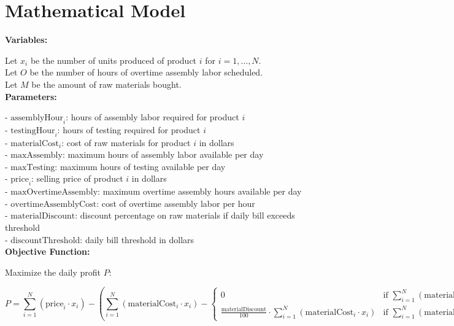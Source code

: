 \documentclass{article}
\begin{document}
\section*{Mathematical Model}

\textbf{Variables:}

Let \( x_i \) be the number of units produced of product \( i \) for \( i = 1, \ldots, N \). \\
Let \( O \) be the number of hours of overtime assembly labor scheduled. \\
Let \( M \) be the amount of raw materials bought. \\

\textbf{Parameters:}

- \( \text{assemblyHour}_i \): hours of assembly labor required for product \( i \) \\
- \( \text{testingHour}_i \): hours of testing required for product \( i \) \\
- \( \text{materialCost}_i \): cost of raw materials for product \( i \) in dollars \\
- \( \text{maxAssembly} \): maximum hours of assembly labor available per day \\
- \( \text{maxTesting} \): maximum hours of testing available per day \\
- \( \text{price}_i \): selling price of product \( i \) in dollars \\
- \( \text{maxOvertimeAssembly} \): maximum overtime assembly hours available per day \\
- \( \text{overtimeAssemblyCost} \): cost of overtime assembly labor per hour \\
- \( \text{materialDiscount} \): discount percentage on raw materials if daily bill exceeds threshold \\
- \( \text{discountThreshold} \): daily bill threshold in dollars \\

\textbf{Objective Function:}

Maximize the daily profit \( P \):

\[
P = \sum_{i=1}^{N} \left( \text{price}_i \cdot x_i \right) - \left( \sum_{i=1}^{N} \left( \text{materialCost}_i \cdot x_i \right) - 
\begin{cases} 
0 & \text{if } \sum_{i=1}^{N} \left( \text{materialCost}_i \cdot x_i \right) \leq \text{discountThreshold} \\
\frac{\text{materialDiscount}}{100} \cdot \sum_{i=1}^{N} \left( \text{materialCost}_i \cdot x_i \right) & \text{if } \sum_{i=1}^{N} \left( \text{materialCost}_i \cdot x_i \right) > \text{discountThreshold}
\end{cases}\right) - \text{overtimeAssemblyCost} \cdot O
\]
\end{document}
